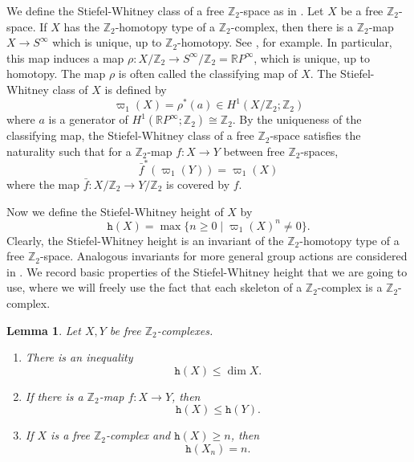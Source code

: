 \documentclass[amsfonts]{amsart}
\numberwithin{equation}{section}
\newtheorem{lemma}[theorem]{Lemma}
\theoremstyle{definition}
\theoremstyle{remark}
\newcommand{\Z}{\mathbb{Z}}
\newcommand{\R}{\mathbb{R}}
\newcommand{\h}{\mathtt{h}}
\begin{document}
  We define the Stiefel-Whitney class of a free $\Z_2$-space as in \cite[Definition 8.21]{K}. Let $X$ be a free $\Z_2$-space. If $X$ has the $\Z_2$-homotopy type of a $\Z_2$-complex, then there is a $\Z_2$-map $X\to S^\infty$ which is unique, up to $\Z_2$-homotopy. See \cite[Proposition 8.16]{K}, for example. In particular, this map induces a map $\rho \colon X/\Z_2 \to S^\infty/ \Z_2 = \R P^\infty$, which is unique, up to homotopy. The map $\rho$ is often called the classifying map of $X$. The Stiefel-Whitney class of $X$ is defined by
  \[
    \varpi_1(X)=\rho^*(a)\in H^1(X/\Z_2;\Z_2)
  \]
  where $a$ is a generator of $H^1(\R P^\infty;\Z_2)\cong\Z_2$. By the uniqueness of the classifying map, the Stiefel-Whitney class of a free $\Z_2$-space satisfies the naturality such that for a $\Z_2$-map $f\colon X\to Y$ between free $\Z_2$-spaces,
  \begin{equation}
    \label{naturality}
    \bar{f}^*(\varpi_1(Y))=\varpi_1(X)
  \end{equation}
  where the map $\bar{f}\colon X/\Z_2\to Y/\Z_2$ is covered by $f$.



  Now we define the Stiefel-Whitney height of $X$ by
  \[
    \h(X)=\max\{n\ge 0\mid\varpi_1(X)^n\ne 0\}.
  \]
  Clearly, the Stiefel-Whitney height is an invariant of the $\Z_2$-homotopy type of a free $\Z_2$-space. Analogous invariants for more general group actions are considered in \cite{FH,HK,HKTT,KM,V}. We record basic properties of the Stiefel-Whitney height that we are going to use, where we will freely use the fact that each skeleton of a $\Z_2$-complex is a $\Z_2$-complex.



  \begin{lemma}
    \label{h(X)}
    Let $X,Y$ be free $\Z_2$-complexes.
    \begin{enumerate}
      \item There is an inequality
      \[
        \h(X)\le\dim X.
      \]

      \item If there is a $\Z_2$-map $f\colon X\to Y$, then
      \[
        \h(X)\le\h(Y).
      \]

      \item If $X$ is a free $\Z_2$-complex and $\h(X)\ge n$, then
      \[
        \h(X_n)=n.
      \]
    \end{enumerate}
  \end{lemma}
\end{document}
